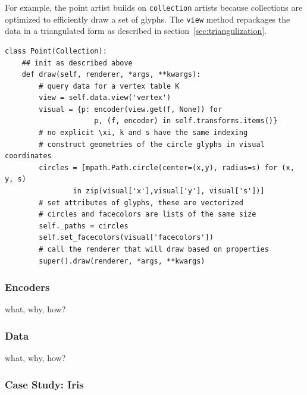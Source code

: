 \documentclass[../main.tex]{subfiles}
\begin{document}
For example, the point artist builds on \texttt{collection} artists because collections are optimized to efficiently draw a set of glyphs. The \texttt{view} method repackages the data in a triangulated form as described in section~\ref{sec:triangulization}. 

\begin{verbatim}
class Point(Collection):
    ## init as described above
    def draw(self, renderer, *args, **kwargs):
        # query data for a vertex table K
        view = self.data.view('vertex') 
        visual = {p: encoder(view.get(f, None)) for
                     p, (f, encoder) in self.transforms.items()}
        # no explicit \xi, k and s have the same indexing
        # construct geometries of the circle glyphs in visual coordinates
        circles = [mpath.Path.circle(center=(x,y), radius=s) for (x, y, s) 
                in zip(visual['x'],visual['y'], visual['s'])] 
        # set attributes of glyphs, these are vectorized 
        # circles and facecolors are lists of the same size
        self._paths = circles
        self.set_facecolors(visual['facecolors'])
        # call the renderer that will draw based on properties
        super().draw(renderer, *args, **kwargs)
\end{verbatim}


\subsubsection{Encoders \vchannel}
what, why, how?
\subsubsection{Data \dtotal}
what, why, how?

\subsubsection{Case Study: Iris}
\end{document}

